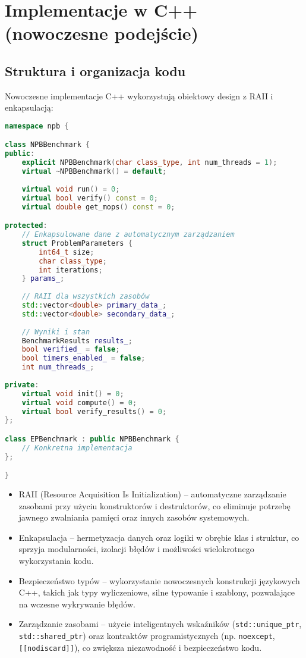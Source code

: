 \section{Implementacje w C++ (nowoczesne podejście)}
\subsection{Struktura i organizacja kodu}
Nowoczesne implementacje C++ wykorzystują obiektowy design z RAII i enkapsulacją:
\begin{lstlisting}[language=C++, caption={Implementacja nowoczesnego C++ - struktura kodu}, label={lst:modern-cpp-structure}]
namespace npb {

class NPBBenchmark {
public:
    explicit NPBBenchmark(char class_type, int num_threads = 1);
    virtual ~NPBBenchmark() = default;
    
    virtual void run() = 0;
    virtual bool verify() const = 0;
    virtual double get_mops() const = 0;

protected:
    // Enkapsulowane dane z automatycznym zarządzaniem
    struct ProblemParameters {
        int64_t size;
        char class_type;
        int iterations;
    } params_;
    
    // RAII dla wszystkich zasobów
    std::vector<double> primary_data_;
    std::vector<double> secondary_data_;
    
    // Wyniki i stan
    BenchmarkResults results_;
    bool verified_ = false;
    bool timers_enabled_ = false;
    int num_threads_;
    
private:
    virtual void init() = 0;
    virtual void compute() = 0;
    virtual bool verify_results() = 0;
};

class EPBenchmark : public NPBBenchmark {
    // Konkretna implementacja
};

}
\end{lstlisting}
\begin{itemize}
    \item RAII (Resource Acquisition Is Initialization) – automatyczne zarządzanie zasobami przy użyciu konstruktorów i destruktorów, co eliminuje potrzebę jawnego zwalniania pamięci oraz innych zasobów systemowych.
    
    \item Enkapsulacja – hermetyzacja danych oraz logiki w obrębie klas i struktur, co sprzyja modularności, izolacji błędów i możliwości wielokrotnego wykorzystania kodu.
    
    \item Bezpieczeństwo typów – wykorzystanie nowoczesnych konstrukcji językowych C++, takich jak typy wyliczeniowe, silne typowanie i szablony, pozwalające na wczesne wykrywanie błędów.
    
    \item Zarządzanie zasobami – użycie inteligentnych wskaźników (\texttt{std::unique\_ptr}, \texttt{std::shared\_ptr}) oraz kontraktów programistycznych (np. \texttt{noexcept}, \texttt{[[nodiscard]]}), co zwiększa niezawodność i bezpieczeństwo kodu.
\end{itemize}

